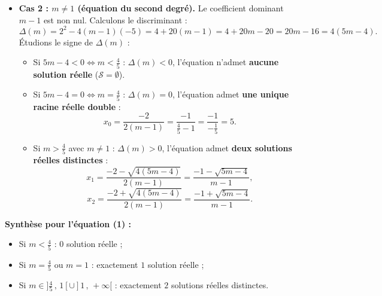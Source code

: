\documentclass[11pt,a4paper]{article}
\begin{document}
\begin{correctionbox}
\begin{enumerate}
\begin{itemize}
        \item \textbf{Cas 2 : $m \neq 1$ (équation du second degré).}
        Le coefficient dominant $m - 1$ est non nul. Calculons le discriminant :
        \[
        \Delta(m) = 2^2 - 4(m-1)(-5) = 4 + 20(m-1) = 4 + 20m - 20 = 20m - 16 = 4(5m - 4).
        \]
        Étudions le signe de $\Delta(m)$ :
        \begin{itemize}
            \item Si $5m - 4 < 0 \iff m < \frac{4}{5}$ : $\Delta(m) < 0$, l'équation n'admet \textbf{aucune solution réelle} ($\mathcal{S} = \emptyset$).
            \item Si $5m - 4 = 0 \iff m = \frac{4}{5}$ : $\Delta(m) = 0$, l'équation admet \textbf{une unique racine réelle double} :
            \[
            x_0 = \frac{-2}{2(m-1)} = \frac{-1}{\frac{4}{5} - 1} = \frac{-1}{-\frac{1}{5}} = 5.
            \]
            \item Si $m > \frac{4}{5}$ avec $m \neq 1$ : $\Delta(m) > 0$, l'équation admet \textbf{deux solutions réelles distinctes} :
            \[
            x_1 = \frac{-2 - \sqrt{4(5m-4)}}{2(m-1)} = \frac{-1 - \sqrt{5m-4}}{m-1},
            \]
            \[
            x_2 = \frac{-2 + \sqrt{4(5m-4)}}{2(m-1)} = \frac{-1 + \sqrt{5m-4}}{m-1}.
            \]
        \end{itemize}
    \end{itemize}
    \textbf{Synthèse pour l'équation (1) :}
    \begin{itemize}
        \item Si $m < \frac{4}{5}$ : $0$ solution réelle ;
        \item Si $m = \frac{4}{5}$ ou $m = 1$ : exactement $1$ solution réelle ;
        \item Si $m \in ]\frac{4}{5}\,,\, 1[ \cup ]1\,,\, +\infty[$ : exactement $2$ solutions réelles distinctes.
    \end{itemize}


\end{enumerate}
\end{correctionbox}
\end{document}
